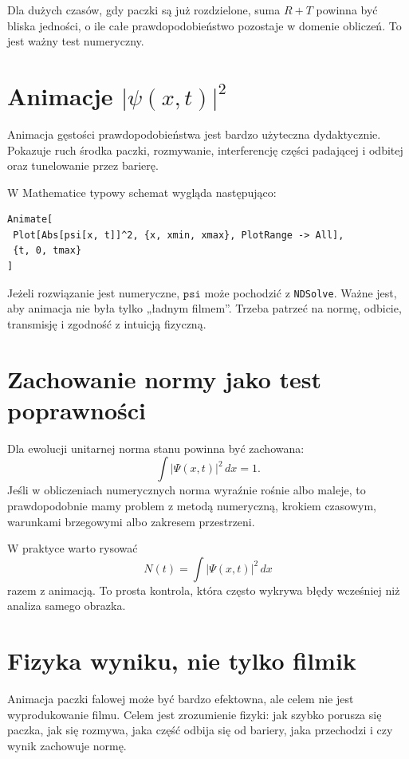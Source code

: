 Dla dużych czasów, gdy paczki są już rozdzielone, suma \(R+T\) powinna być bliska jedności, o ile całe prawdopodobieństwo pozostaje w domenie obliczeń. To jest ważny test numeryczny.

\section{Animacje \texorpdfstring{\(|\psi(x,t)|^2\)}{|psi(x,t)|^2}}

Animacja gęstości prawdopodobieństwa jest bardzo użyteczna dydaktycznie. Pokazuje ruch środka paczki, rozmywanie, interferencję części padającej i odbitej oraz tunelowanie przez barierę.

W Mathematice typowy schemat wygląda następująco:
\begin{verbatim}
Animate[
 Plot[Abs[psi[x, t]]^2, {x, xmin, xmax}, PlotRange -> All],
 {t, 0, tmax}
]
\end{verbatim}
Jeżeli rozwiązanie jest numeryczne, \(\texttt{psi}\) może pochodzić z \texttt{NDSolve}. Ważne jest, aby animacja nie była tylko „ładnym filmem”. Trzeba patrzeć na normę, odbicie, transmisję i zgodność z intuicją fizyczną.

\section{Zachowanie normy jako test poprawności}

Dla ewolucji unitarnej norma stanu powinna być zachowana:
\begin{equation}
    \int |\Psi(x,t)|^2\,dx=1.
\end{equation}
Jeśli w obliczeniach numerycznych norma wyraźnie rośnie albo maleje, to prawdopodobnie mamy problem z metodą numeryczną, krokiem czasowym, warunkami brzegowymi albo zakresem przestrzeni.

W praktyce warto rysować
\begin{equation}
    N(t)=\int |\Psi(x,t)|^2\,dx
\end{equation}
razem z animacją. To prosta kontrola, która często wykrywa błędy wcześniej niż analiza samego obrazka.

\section{Fizyka wyniku, nie tylko filmik}

Animacja paczki falowej może być bardzo efektowna, ale celem nie jest wyprodukowanie filmu. Celem jest zrozumienie fizyki: jak szybko porusza się paczka, jak się rozmywa, jaka część odbija się od bariery, jaka przechodzi i czy wynik zachowuje normę.

